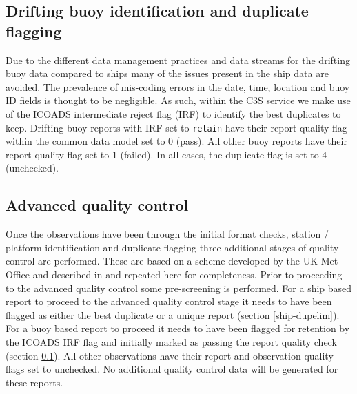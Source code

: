 \FloatBarrier
\subsection{Drifting buoy identification and duplicate flagging}\label{buoy-dupelim}
Due to the different data management practices and data streams for the drifting buoy data compared to ships many of the issues present in the ship data are avoided. 
The prevalence of mis-coding errors in the date, time, location and buoy ID fields is thought to be negligible.
As such, within the C3S service we make use of the ICOADS intermediate reject flag (IRF) to identify the best duplicates to keep.
Drifting buoy reports with IRF set to \texttt{retain} have their report quality flag within the common data model set to 0 (pass).
All other buoy reports have their report quality flag set to 1 (failed). 
In all cases, the duplicate flag is set to 4 (unchecked).
\FloatBarrier
\subsection{Advanced quality control}
Once the observations have been through the initial format checks, station / platform identification and duplicate flagging three additional stages of quality control are performed. 
These are based on a scheme developed by the UK Met Office and described in \cite{Kennedy2019} and repeated here for completeness.
Prior to proceeding to the advanced quality control some pre-screening is performed.
For a ship based report to proceed to the advanced quality control stage it needs to have been flagged as either the best duplicate or a unique report (section \ref{ship-dupelim}).
For a buoy based report to proceed it needs to have been flagged for retention by the ICOADS IRF flag and initially marked as passing the report quality check (section \ref{buoy-dupelim}).
All other observations have their report and observation quality flags set to unchecked. No additional quality control data will be generated for these reports.
\FloatBarrier
